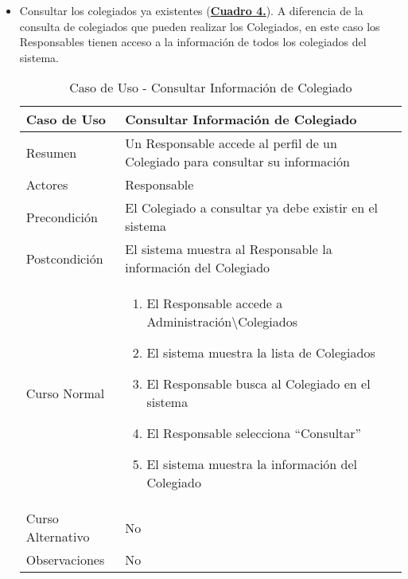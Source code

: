 \begin{itemize}
	\item \addtocounter{tabla}{1} Consultar los colegiados ya existentes (\textbf{\hyperref[tab:curConsultaInfoColeg]{Cuadro 4.}}). A diferencia de la consulta de colegiados que pueden realizar los Colegiados, en este caso los Responsables tienen acceso a la información de todos los colegiados del sistema.
		\begin{table}[!htbp]
		  \centering  \addtocounter{casouso}{1}
		  \begin{tabular}{|l | p{100mm}|}
		    \textbf{Caso de Uso}  & \textbf{Consultar Información de Colegiado} \\ \hline
		    Resumen 		 & Un Responsable accede al perfil de un Colegiado para consultar su información \\ \hline
		    Actores  		 & Responsable \\ \hline
		    Precondición  	 & El Colegiado a consultar ya debe existir en el sistema \\ \hline
		    Postcondición  	 & El sistema muestra al Responsable la información del Colegiado \\ \hline
		    Curso Normal   	 & \begin{enumerate}
			  \item El Responsable accede a Administración\textbackslash Colegiados
			  \item El sistema muestra la lista de Colegiados
			  \item El Responsable busca al Colegiado en el sistema
			  \item El Responsable selecciona ``Consultar''
			  \item El sistema muestra la información del Colegiado
		    \end{enumerate}  \\ \hline
		    Curso Alternativo  & No  \\ \hline
		    Observaciones 	 & No \\ \hline
		  \end{tabular}
		  \caption{Caso de Uso  - Consultar Información de Colegiado}
		  \label{tab:curConsultaInfoColeg}
		\end{table}
		\FloatBarrier \pagebreak


\end{itemize}
